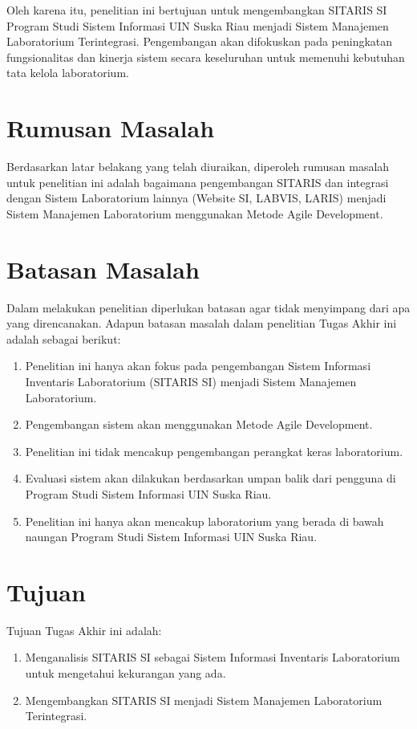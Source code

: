 Oleh karena itu, penelitian ini bertujuan untuk mengembangkan SITARIS SI Program Studi Sistem Informasi UIN Suska Riau menjadi Sistem Manajemen Laboratorium Terintegrasi. Pengembangan akan difokuskan pada peningkatan fungsionalitas dan kinerja sistem secara keseluruhan untuk memenuhi kebutuhan tata kelola laboratorium.
\section{Rumusan Masalah}
Berdasarkan latar belakang yang telah diuraikan, diperoleh rumusan masalah untuk penelitian ini adalah bagaimana pengembangan SITARIS dan integrasi dengan Sistem Laboratorium lainnya (Website SI, LABVIS, LARIS) menjadi Sistem Manajemen Laboratorium menggunakan Metode Agile Development.

\section{Batasan Masalah}
Dalam melakukan penelitian diperlukan batasan agar tidak menyimpang dari apa yang direncanakan. Adapun batasan masalah dalam penelitian Tugas Akhir ini adalah sebagai berikut:
\begin{enumerate}
	\item Penelitian ini hanya akan fokus pada pengembangan Sistem Informasi Inventaris Laboratorium (SITARIS SI) menjadi Sistem Manajemen Laboratorium.
	\item Pengembangan sistem akan menggunakan Metode Agile Development.
	\item Penelitian ini tidak mencakup pengembangan perangkat keras laboratorium.
	\item Evaluasi sistem akan dilakukan berdasarkan umpan balik dari pengguna di Program Studi Sistem Informasi UIN Suska Riau.
	\item Penelitian ini hanya akan mencakup laboratorium yang berada di bawah naungan Program Studi Sistem Informasi UIN Suska Riau.
\end{enumerate}

\section{Tujuan}
Tujuan Tugas Akhir ini adalah:
\begin{enumerate}
	\item Menganalisis SITARIS SI sebagai Sistem Informasi Inventaris Laboratorium untuk mengetahui kekurangan yang ada.
	\item Mengembangkan SITARIS SI menjadi Sistem Manajemen Laboratorium Terintegrasi.
\end{enumerate}

